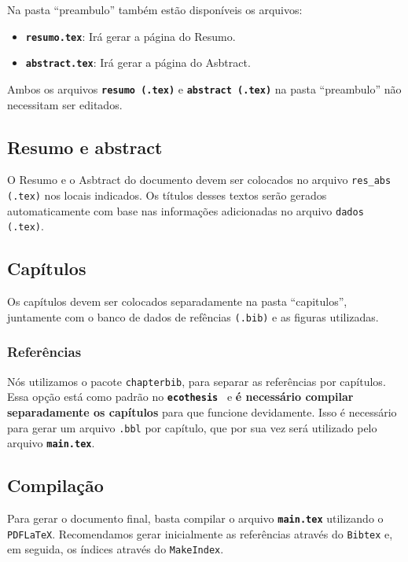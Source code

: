 \documentclass{article}
\newcommand{\modelo}{\texttt{\textbf{ecothesis}}}
\begin{document}
Na pasta ``preambulo'' também estão disponíveis os arquivos:

\begin{itemize}
 \item \texttt{\textbf{resumo.tex}}: Irá gerar a página do Resumo.
 \item \texttt{\textbf{abstract.tex}}: Irá gerar a página do Asbtract.
\end{itemize}

Ambos os arquivos \texttt{\textbf{resumo (.tex)}} e \texttt{\textbf{abstract (.tex)}} na pasta ``preambulo'' não necessitam ser editados.

\subsection{Resumo e abstract}

O Resumo e o Asbtract do documento devem ser colocados no arquivo \texttt{res\_abs (.tex)} nos locais indicados. Os títulos desses textos serão gerados automaticamente com base nas informações adicionadas no arquivo \texttt{dados (.tex)}.

\subsection{Capítulos}

Os capítulos devem ser colocados separadamente na pasta ``capitulos'', juntamente com o banco de dados de refências \texttt{(.bib)} e as figuras utilizadas.

\subsubsection{Referências}

Nós utilizamos o pacote \texttt{chapterbib}, para separar as referências por capítulos. Essa opção está como padrão no \modelo~ e \textbf{é necessário compilar separadamente os capítulos} para que funcione devidamente. Isso é necessário para gerar um arquivo \texttt{.bbl} por capítulo, que por sua vez será utilizado pelo arquivo \texttt{\textbf{main.tex}}.


\subsection{Compilação}

Para gerar o documento final, basta compilar o arquivo \texttt{\textbf{main.tex}} utilizando o \texttt{PDFLaTeX}. Recomendamos gerar inicialmente as referências através do \texttt{Bibtex} e, em seguida, os índices através do \texttt{MakeIndex}.
\end{document}
